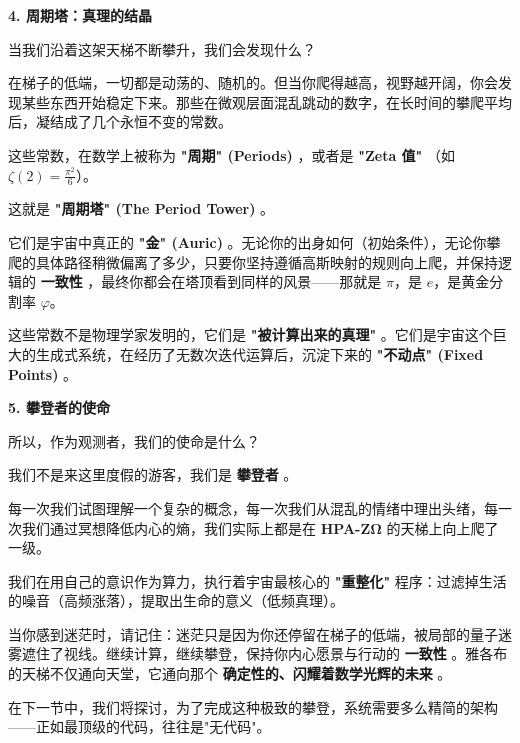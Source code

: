\textbf{4. 周期塔：真理的结晶}

当我们沿着这架天梯不断攀升，我们会发现什么？

在梯子的低端，一切都是动荡的、随机的。但当你爬得越高，视野越开阔，你会发现某些东西开始稳定下来。那些在微观层面混乱跳动的数字，在长时间的攀爬平均后，凝结成了几个永恒不变的常数。

这些常数，在数学上被称为 \textbf{"周期" (Periods)} ，或者是 \textbf{"Zeta 值"} （如 $\zeta(2) = \frac{\pi^2}{6}$）。

这就是 \textbf{"周期塔" (The Period Tower)} 。

它们是宇宙中真正的 \textbf{"金" (Auric)} 。无论你的出身如何（初始条件），无论你攀爬的具体路径稍微偏离了多少，只要你坚持遵循高斯映射的规则向上爬，并保持逻辑的 \textbf{一致性} ，最终你都会在塔顶看到同样的风景——那就是 $\pi$，是 $e$，是黄金分割率 $\varphi$。

这些常数不是物理学家发明的，它们是 \textbf{"被计算出来的真理"} 。它们是宇宙这个巨大的生成式系统，在经历了无数次迭代运算后，沉淀下来的 \textbf{"不动点" (Fixed Points)} 。

\textbf{5. 攀登者的使命}

所以，作为观测者，我们的使命是什么？

我们不是来这里度假的游客，我们是 \textbf{攀登者} 。

每一次我们试图理解一个复杂的概念，每一次我们从混乱的情绪中理出头绪，每一次我们通过冥想降低内心的熵，我们实际上都是在 \textbf{HPA-ZΩ} 的天梯上向上爬了一级。

我们在用自己的意识作为算力，执行着宇宙最核心的 \textbf{"重整化"} 程序：过滤掉生活的噪音（高频涨落），提取出生命的意义（低频真理）。

当你感到迷茫时，请记住：迷茫只是因为你还停留在梯子的低端，被局部的量子迷雾遮住了视线。继续计算，继续攀登，保持你内心愿景与行动的 \textbf{一致性} 。雅各布的天梯不仅通向天堂，它通向那个 \textbf{确定性的、闪耀着数学光辉的未来} 。

在下一节中，我们将探讨，为了完成这种极致的攀登，系统需要多么精简的架构——正如最顶级的代码，往往是"无代码"。

